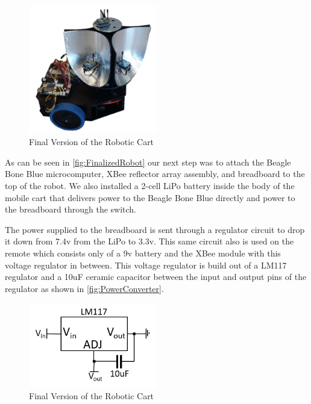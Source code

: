 \begin{figure}
	\centering
	\includegraphics[width=0.5\textwidth]{figs/img/Finalized_robot.png}
	\caption{Final Version of the Robotic Cart}
 	\label{fig:FinalizedRobot}
\end{figure}

As can be seen in \autoref{fig:FinalizedRobot} our next step was to attach the Beagle Bone Blue microcomputer, XBee reflector array assembly, and breadboard to the top of the robot.  We also installed a 2-cell LiPo battery inside the body of the mobile cart that delivers power to the Beagle Bone Blue directly and power to the breadboard through the switch. \par
The power supplied to the breadboard is sent through a regulator circuit to drop it down from 7.4v from the LiPo to 3.3v.  This same circuit also is used on the remote which consists only of a 9v battery and the XBee module with this voltage regulator in between.  This voltage regulator is build out of a LM117 regulator and a 10uF ceramic capacitor between the input and output pins of the regulator as shown in \autoref{fig:PowerConverter}.

\begin{figure}
	\centering
	\includegraphics[width=0.5\textwidth]{figs/img/PowerConverter.png}
	\caption{Final Version of the Robotic Cart}
 	\label{fig:PowerConverter}
\end{figure}

